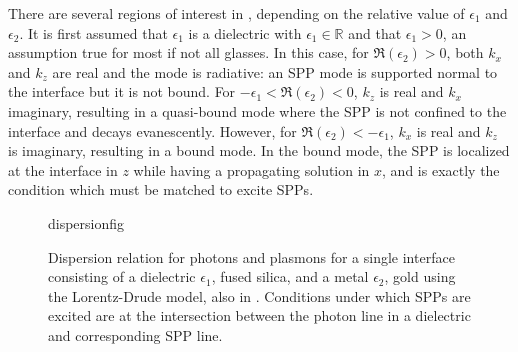 There are several regions of interest in ,
depending on the relative value of $\epsilon_1$ and $\epsilon_2$.  It is
first assumed that $\epsilon_1$ is a dielectric with
$\epsilon_1\in\mathbb{R}$ and that $\epsilon_1 > 0$, an assumption true for
most if not all glasses.  In this case, for $\Re(\epsilon_2)>0$, both $k_x$
and $k_z$ are real and the mode is radiative: an SPP mode is supported
normal to the interface but it is not bound.  For
$-\epsilon_1<\Re(\epsilon_2)<0$, $k_z$ is real and $k_x$ imaginary,
resulting in a quasi-bound mode where the SPP is not confined to the
interface and decays evanescently.  However, for
$\Re(\epsilon_2)<-\epsilon_1$, $k_x$ is real and $k_z$ is imaginary,
resulting in a bound mode.  In the bound mode, the SPP is localized at the
interface in $z$ while having a propagating solution in $x$, and is exactly
the condition which must be matched to excite SPPs.
\begin{figure}[ht]
 \centering
{dispersionfig}
\caption{ Dispersion relation for photons and plasmons for a single
interface consisting of a dielectric $\epsilon_1$, fused silica, and a
metal $\epsilon_2$, gold using the Lorentz-Drude model, also in
. Conditions under which SPPs are excited are at the
intersection between the photon line in a dielectric and corresponding SPP line.  }
\label{fig:dispersionrelation}
\end{figure}
